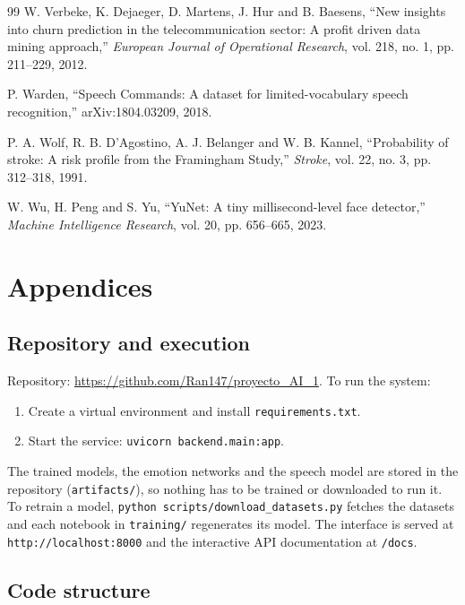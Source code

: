 \documentclass[11pt,letterpaper]{article}
\newcommand{\code}[1]{\texttt{#1}}
\begin{document}
\begin{thebibliography}{99}
 W. Verbeke, K. Dejaeger, D. Martens, J. Hur and B. Baesens, ``New insights into churn prediction in the telecommunication sector: A profit driven data mining approach,'' \emph{European Journal of Operational Research}, vol. 218, no. 1, pp. 211--229, 2012.

 P. Warden, ``Speech Commands: A dataset for limited-vocabulary speech recognition,'' arXiv:1804.03209, 2018.

 P. A. Wolf, R. B. D'Agostino, A. J. Belanger and W. B. Kannel, ``Probability of stroke: A risk profile from the Framingham Study,'' \emph{Stroke}, vol. 22, no. 3, pp. 312--318, 1991.

 W. Wu, H. Peng and S. Yu, ``YuNet: A tiny millisecond-level face detector,'' \emph{Machine Intelligence Research}, vol. 20, pp. 656--665, 2023.

\end{thebibliography}

\appendix
\section{Appendices}

\subsection{Repository and execution}

Repository: \url{https://github.com/Ran147/proyecto_AI_1}. To run the system:

\begin{enumerate}
\item Create a virtual environment and install \code{requirements.txt}.
\item Start the service: \code{uvicorn backend.main:app}.
\end{enumerate}

\sloppy The trained models, the emotion networks and the speech model are stored in the repository (\code{artifacts/}), so nothing has to be trained or downloaded to run it. To retrain a model, \code{python scripts/download\_datasets.py} fetches the datasets and each notebook in \code{training/} regenerates its model. The interface is served at \code{http://localhost:8000} and the interactive API documentation at \code{/docs}.

\subsection{Code structure}
\end{document}
